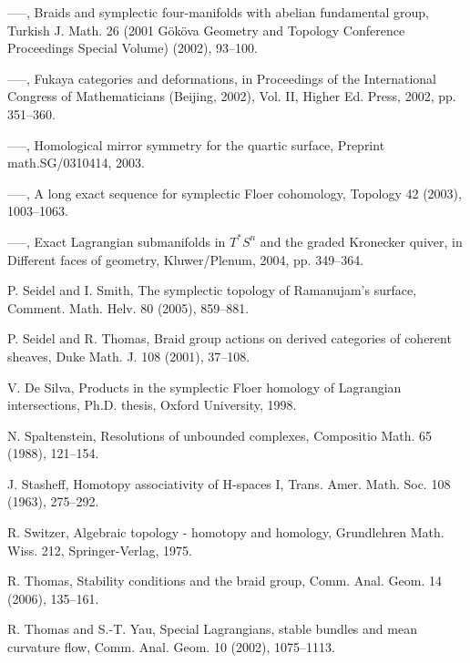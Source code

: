 \begin{list}{}{\setlength{\leftmargin}{3em}\setlength{\labelwidth}{2.5em}\setlength{\itemsep}{.5em}\small}
\item[\hypertarget{bib:128}{[128]}] —–, Braids and symplectic four-manifolds with abelian fundamental group, Turkish J. Math. 26 (2001 Gököva Geometry and Topology Conference Proceedings Special Volume) (2002), 93–100. 
\item[\hypertarget{bib:129}{[129]}] —–, Fukaya categories and deformations, in Proceedings of the International Congress of Mathematicians (Beijing, 2002), Vol. II, Higher Ed. Press, 2002, pp. 351–360. 
\item[\hypertarget{bib:130}{[130]}] —–, Homological mirror symmetry for the quartic surface, Preprint math.SG/0310414, 2003. 
\item[\hypertarget{bib:131}{[131]}] —–, A long exact sequence for symplectic Floer cohomology, Topology 42 (2003), 1003–1063. 
\item[\hypertarget{bib:132}{[132]}] —–, Exact Lagrangian submanifolds in $T^*S^n$ and the graded Kronecker quiver, in Different faces of geometry, Kluwer/Plenum, 2004, pp. 349–364. 
\item[\hypertarget{bib:133}{[133]}] P. Seidel and I. Smith, The symplectic topology of Ramanujam's surface, Comment. Math. Helv. 80 (2005), 859–881. 
\item[\hypertarget{bib:134}{[134]}] P. Seidel and R. Thomas, Braid group actions on derived categories of coherent sheaves, Duke Math. J. 108 (2001), 37–108. 
\item[\hypertarget{bib:135}{[135]}] V. De Silva, Products in the symplectic Floer homology of Lagrangian intersections, Ph.D. thesis, Oxford University, 1998. 
\item[\hypertarget{bib:136}{[136]}] N. Spaltenstein, Resolutions of unbounded complexes, Compositio Math. 65 (1988), 121–154. 
\item[\hypertarget{bib:137}{[137]}] J. Stasheff, Homotopy associativity of H-spaces I, Trans. Amer. Math. Soc. 108 (1963), 275–292. 
\item[\hypertarget{bib:138}{[138]}] R. Switzer, Algebraic topology - homotopy and homology, Grundlehren Math. Wiss. 212, Springer-Verlag, 1975. 
\item[\hypertarget{bib:139}{[139]}] R. Thomas, Stability conditions and the braid group, Comm. Anal. Geom. 14 (2006), 135–161. 
\item[\hypertarget{bib:140}{[140]}] R. Thomas and S.-T. Yau, Special Lagrangians, stable bundles and mean curvature flow, Comm. Anal. Geom. 10 (2002), 1075–1113. 

\end{list}
